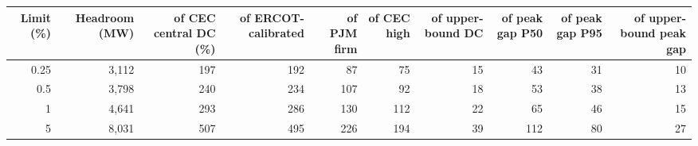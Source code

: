 \begin{tabular}{rrrrrrrrrr}
\toprule
Limit (\%) & Headroom (MW) & of CEC central DC (\%) & of ERCOT-calibrated & of PJM firm & of CEC high & of upper-bound DC & of peak gap P50 & of peak gap P95 & of upper-bound peak gap \\
\midrule
0.25 & 3,112 & 197 & 192 & 87 & 75 & 15 & 43 & 31 & 10 \\
0.5 & 3,798 & 240 & 234 & 107 & 92 & 18 & 53 & 38 & 13 \\
1 & 4,641 & 293 & 286 & 130 & 112 & 22 & 65 & 46 & 15 \\
5 & 8,031 & 507 & 495 & 226 & 194 & 39 & 112 & 80 & 27 \\
\bottomrule
\end{tabular}